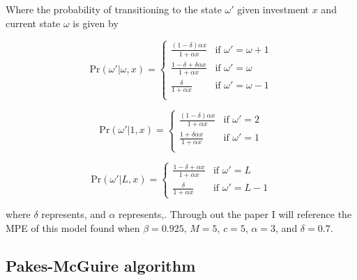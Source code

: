\documentclass[12pt]{article}
\begin{document}
Where the probability of transitioning to the state $\omega'$ given investment $x$ and current state $\omega$ is given by

\begin{equation*}
  \text{Pr}(\omega'|\omega,x) =
  \begin{cases}
    \frac{(1-\delta) \alpha x}{1+\alpha x} & \text{if } \omega'=\omega+1\\
    \frac{1-\delta+\delta \alpha x}{1+\alpha x} & \text{if } \omega' = \omega\\
    \frac{\delta}{1+\alpha x} & \text{if } \omega' = \omega-1\\
  \end{cases}
\end{equation*}

\begin{equation*}
  \text{Pr}(\omega'|1,x) =
  \begin{cases}
    \frac{(1-\delta) \alpha x}{1+\alpha x} & \text{if } \omega'=2\\
    \frac{1+\delta \alpha x}{1+\alpha x} & \text{if } \omega'=1\\
  \end{cases}
\end{equation*}

\begin{equation*}
  \text{Pr}(\omega'|L,x) =
  \begin{cases}
    \frac{1-\delta+\alpha x}{1+\alpha x} & \text{if } \omega'=L\\
    \frac{\delta}{1+\alpha x} & \text{if } \omega'=L-1
  \end{cases}
\end{equation*}

where $\delta$ represents, and $\alpha$ represents,. Through out the paper I will reference the MPE of this model found when $\beta=0.925$, $M=5$, $c=5$, $\alpha=3$, and $\delta=0.7$.

\subsection{Pakes-McGuire algorithm}

\end{document}
